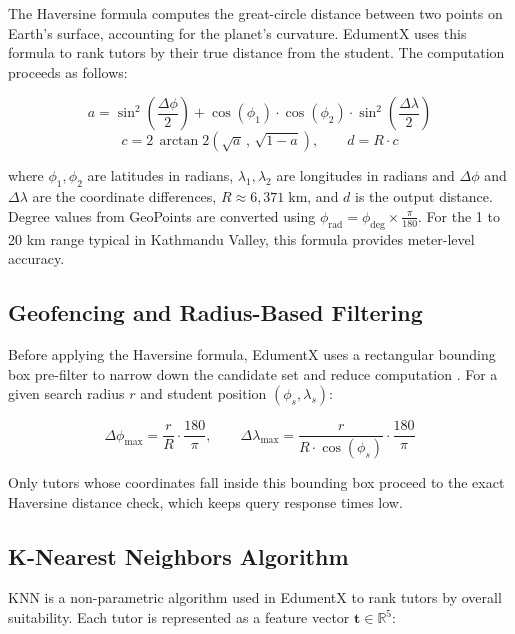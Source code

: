 \documentclass[12pt]{report}
\begin{document}
The Haversine formula computes the great-circle distance between two points on Earth's surface, accounting for the planet's curvature. EdumentX uses this formula to rank tutors by their true distance from the student. The computation proceeds as follows:

\begin{equation}
a = \sin^2\!\left(\frac{\Delta\phi}{2}\right) + \cos(\phi_1)\cdot\cos(\phi_2)\cdot\sin^2\!\left(\frac{\Delta\lambda}{2}\right)
\end{equation}
\begin{equation}
c = 2\,\arctan2\!\left(\sqrt{a}\,,\,\sqrt{1-a}\right), \qquad d = R \cdot c
\end{equation}

\noindent where $\phi_1, \phi_2$ are latitudes in radians, $\lambda_1, \lambda_2$ are longitudes in radians and $\Delta\phi$ and $\Delta\lambda$ are the coordinate differences, $R \approx 6{,}371\;\text{km}$, and $d$ is the output distance. Degree values from GeoPoints are converted using $\phi_{\text{rad}} = \phi_{\text{deg}} \times \frac{\pi}{180}$. For the 1 to 20 km range typical in Kathmandu Valley, this formula provides meter-level accuracy.

\subsection{Geofencing and Radius-Based Filtering}

Before applying the Haversine formula, EdumentX uses a rectangular bounding box pre-filter to narrow down the candidate set and reduce computation \citep{shevchenko2023}. For a given search radius $r$ and student position $(\phi_s, \lambda_s)$:

\begin{equation}
\Delta\phi_{\max} = \frac{r}{R} \cdot \frac{180}{\pi}, \qquad
\Delta\lambda_{\max} = \frac{r}{R \cdot \cos(\phi_s)} \cdot \frac{180}{\pi}
\end{equation}

\noindent Only tutors whose coordinates fall inside this bounding box proceed to the exact Haversine distance check, which keeps query response times low.

\subsection{K-Nearest Neighbors Algorithm}

KNN is a non-parametric algorithm used in EdumentX to rank tutors by overall suitability. Each tutor is represented as a feature vector $\mathbf{t} \in \mathbb{R}^5$:
\end{document}
